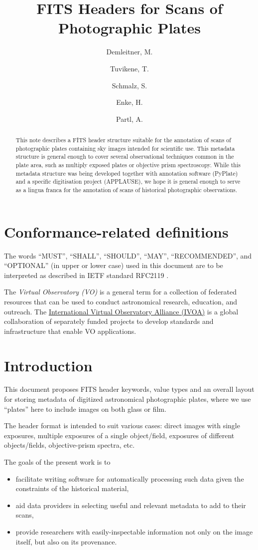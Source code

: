 \documentclass[11pt]{ivoa}
\title{FITS Headers for Scans of Photographic Plates}
\author{Demleitner, M.}
\author{Tuvikene, T.}
\author{Schmalz, S.}
\author{Enke, H.}
\author{Partl, A.}
\begin{document}
\begin{abstract}
This note describes a FITS header structure suitable for the annotation
of scans of photographic plates containing sky images intended for
scientific use.  This metadata structure is general enough to cover
several observational techniques common in the plate area, such as
multiply exposed plates or objective prism spectroscopy.  While this
metadata structure was being developed together with annotation software
(PyPlate) and a specific digitisation project
(APPLAUSE), we hope it is general enough to serve as a lingua franca for
the annotation of scans of historical photographic observations.

\end{abstract}


\section*{Conformance-related definitions}

The words ``MUST'', ``SHALL'', ``SHOULD'', ``MAY'', ``RECOMMENDED'', and
``OPTIONAL'' (in upper or lower case) used in this document are to be
interpreted as described in IETF standard RFC2119 \citep{std:RFC2119}.

The \emph{Virtual Observatory (VO)} is a
general term for a collection of federated resources that can be used
to conduct astronomical research, education, and outreach.
The \href{https://www.ivoa.net}{International
Virtual Observatory Alliance (IVOA)} is a global
collaboration of separately funded projects to develop standards and
infrastructure that enable VO applications.


\section{Introduction}

This document  proposes FITS \citep{std:FITS} header keywords, value
types and an overall layout for storing metadata of digitized
astronomical photographic plates, where we use ``plates'' here to
include images on both glass or film.

The header format is intended to suit
various cases: direct images with single exposures, multiple exposures
of a single object/field, exposures of different objects/fields,
objective-prism spectra, etc.

The goals of the present work is to 

\begin{itemize}
\item facilitate writing software for automatically processing such data
given the constraints of the historical material,

\item aid data providers in selecting useful and relevant metadata to
add to their scans,

\item provide researchers with easily-inspectable information not only
on the image itself, but also on its provenance.
\end{itemize}
\end{document}
